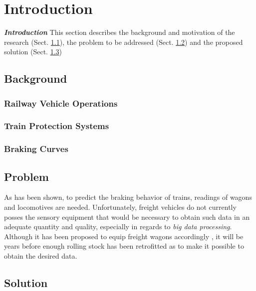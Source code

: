 \chapter{Introduction}
\label{chap:Introduction}
\par\noindent
\emph{\textbf{Introduction}} This section describes the background and motivation of the research (Sect. \ref{sec:Background}), the problem to be addressed (Sect. \ref{sec:Problem}) and the proposed solution (Sect. \ref{sec:Solution}) 

\section{Background}
\label{sec:Background}

\subsection{Railway Vehicle Operations}
\label{sec:RailwayVehicleOperations}

\subsection{Train Protection Systems}
\label{sec:TrainProtectionSystems}

\subsection{Braking Curves}
\label{sec:BrakingCurves}

\section{Problem}
\label{sec:Problem}

\par\noindent
As has been shown, to predict the braking behavior of trains, readings of wagons and locomotives are needed. Unfortunately, freight vehicles do not currently posses the sensory equipment that would be necessary to obtain such data in an adequate quantity and quality, especially in regards to \emph{big data processing}. Although it has been proposed to equip freight wagons accordingly , it will be years before enough rolling stock has been retrofitted as to make it possible to obtain the desired data.

\section{Solution}
\label{sec:Solution}

